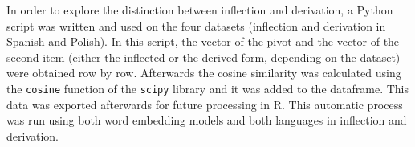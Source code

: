 \documentclass[12pt]{article}
\begin{document}
In order to explore the distinction between inflection and derivation, a Python script was written and used on the four datasets (inflection and derivation in Spanish and Polish). In this script, the vector of the pivot and the vector of the second item (either the inflected or the derived form, depending on the dataset) were obtained row by row. Afterwards the cosine similarity was calculated using the \texttt{cosine} function of the \texttt{scipy} library and it was added to the dataframe. This data was exported afterwards for future processing in R. This automatic process was run using both word embedding models and both languages in inflection and derivation.





\end{document}
